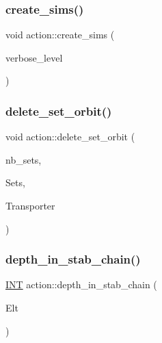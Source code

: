 \mbox{\label{classaction_aabdb8aa15327fc527589f38d85102914}} 
\subsubsection{\texorpdfstring{create\+\_\+sims()}{create\_sims()}}
{\footnotesize\ttfamily void action\+::create\+\_\+sims (\begin{DoxyParamCaption}\item[{\mbox{\hyperlink{galois_8h_a09fddde158a3a20bd2dcadb609de11dc}{I\+NT}}}]{verbose\+\_\+level }\end{DoxyParamCaption})}

\mbox{\label{classaction_a0b3e2e6836ed8ec81e3e74e167c3792b}} 
\subsubsection{\texorpdfstring{delete\+\_\+set\+\_\+orbit()}{delete\_set\_orbit()}}
{\footnotesize\ttfamily void action\+::delete\+\_\+set\+\_\+orbit (\begin{DoxyParamCaption}\item[{\mbox{\hyperlink{galois_8h_a09fddde158a3a20bd2dcadb609de11dc}{I\+NT}}}]{nb\+\_\+sets,  }\item[{\mbox{\hyperlink{galois_8h_a09fddde158a3a20bd2dcadb609de11dc}{I\+NT}} $\ast$$\ast$}]{Sets,  }\item[{\mbox{\hyperlink{galois_8h_a09fddde158a3a20bd2dcadb609de11dc}{I\+NT}} $\ast$$\ast$}]{Transporter }\end{DoxyParamCaption})}

\mbox{\label{classaction_a10b3912651ec1f73a5b1f2f4bc1f4fd2}} 
\subsubsection{\texorpdfstring{depth\+\_\+in\+\_\+stab\+\_\+chain()}{depth\_in\_stab\_chain()}}
{\footnotesize\ttfamily \mbox{\hyperlink{galois_8h_a09fddde158a3a20bd2dcadb609de11dc}{I\+NT}} action\+::depth\+\_\+in\+\_\+stab\+\_\+chain (\begin{DoxyParamCaption}\item[{\mbox{\hyperlink{galois_8h_a09fddde158a3a20bd2dcadb609de11dc}{I\+NT}} $\ast$}]{Elt }\end{DoxyParamCaption})}

